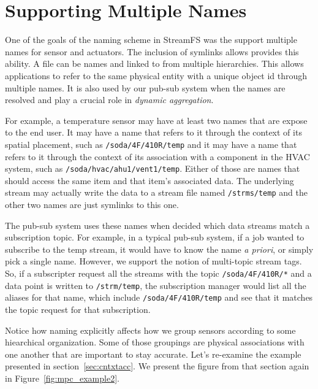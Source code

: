 \section{Supporting Multiple Names}

One of the goals of the naming scheme in StreamFS was the support multiple names for sensor and actuators.  The inclusion of symlinks
allows provides this ability.  A file can be names and linked to from multiple hierarchies.  This allows applications to refer
to the same physical entity with a unique object id through multiple names.  It is also used by our pub-sub system when
the names are resolved and play a crucial role in \emph{dynamic aggregation}.

For example, a temperature sensor may have at least two names that are expose to the end user.  It may have a name that refers to 
it through the context of its spatial placement, such as \texttt{/soda/4F/410R/temp} and it may have a name that refers to it 
through the context of its association with a component in the HVAC system, such as \texttt{/soda/hvac/ahu1/vent1/temp}.  Either
of those are names that should access the same item and that item's associated data.  The underlying stream may actually write
the data to a stream file named \texttt{/strms/temp} and the other two names are just symlinks to this one.  

The pub-sub system uses these names when decided which data streams match a subscription topic.  For example, in a typical pub-sub system,
if a job wanted to subscribe to the temp stream, it would have to know the name \emph{a priori}, or simply pick a single name.
However, we support the notion of multi-topic stream tags.  So, if a subscripter request all the streams with the topic 
\texttt{/soda/4F/410R/*} and a data point is written to \texttt{/strm/temp}, the subscription manager would list all the aliases
for that name, which include \texttt{/soda/4F/410R/temp} and see that it matches the topic request for that subscription.

Notice how naming explicitly affects how we group sensors according to some hiearchical organization.  Some of those groupings
are physical associations with one another that are important to stay accurate.  Let's re-examine the example presented in
section~\ref{sec:cntxtacc}.  We present the figure from that section again in Figure~\ref{fig:mpc_example2}.


